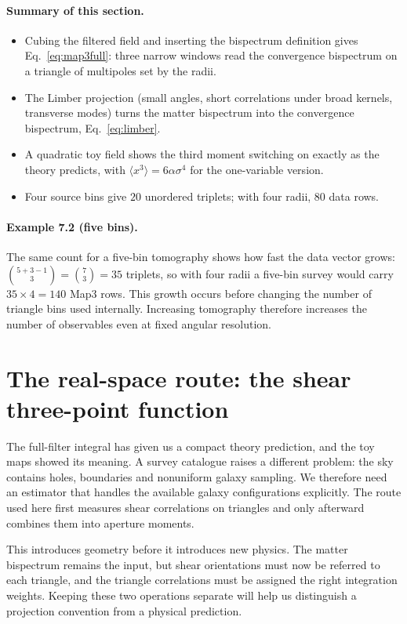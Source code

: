 \documentclass[11pt]{article}
\numberwithin{equation}{section}
\begin{document}
\paragraph{Summary of this section.}
\begin{itemize}
  \item Cubing the filtered field and inserting the bispectrum
    definition gives Eq.~\eqref{eq:map3full}: three narrow windows
    read the convergence bispectrum on a triangle of multipoles set
    by the radii.
  \item The Limber projection (small angles, short correlations
    under broad kernels, transverse modes) turns the matter
    bispectrum into the convergence bispectrum,
    Eq.~\eqref{eq:limber}.
  \item A quadratic toy field shows the third moment switching on
    exactly as the theory predicts, with
    $\langle x^3\rangle = 6\alpha\sigma^4$ for the one-variable
    version.
  \item Four source bins give $20$ unordered triplets; with four
    radii, $80$ data rows.
\end{itemize}

\paragraph{Example 7.2 (five bins).}
The same count for a five-bin tomography shows how fast the data
vector grows: $\binom{5+3-1}{3} = \binom{7}{3} = 35$ triplets, so
with four radii a five-bin survey would carry
$35 \times 4 = 140$ Map3 rows. This growth occurs before changing the
number of triangle bins used internally. Increasing tomography therefore
increases the number of observables even at fixed angular resolution.
\section{The real-space route: the shear three-point function}
\label{sec:threepcf}

The full-filter integral has given us a compact theory prediction, and
the toy maps showed its meaning. A survey catalogue raises a different
problem: the sky contains holes, boundaries and nonuniform galaxy
sampling. We therefore need an estimator that handles the available
galaxy configurations explicitly. The route used here first measures
shear correlations on triangles and only afterward combines them into
aperture moments.

This introduces geometry before it introduces new physics. The matter
bispectrum remains the input, but shear orientations must now be referred
to each triangle, and the triangle correlations must be assigned the
right integration weights. Keeping these two operations separate will
help us distinguish a projection convention from a physical prediction.
\end{document}
